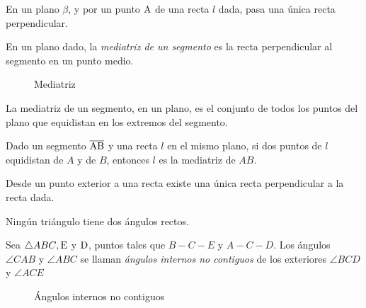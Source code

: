 \begin{theorem}
    En un plano $\beta$, y por un punto $\rm A$ de una recta $l$ dada, pasa una única recta perpendicular.
\end{theorem}

\begin{definition}
    En un plano dado, la \textit{mediatriz de un segmento} es la recta perpendicular al segmento en un punto medio.

    \begin{figure}[!h]
        \centering
        
        \caption{Mediatriz}
        \label{fig:bisector}
    \end{figure}
    
\end{definition}

\begin{theorem}
    La mediatriz de un segmento, en un plano, es el conjunto de todos los puntos del plano que equidistan en los extremos del segmento.
\end{theorem}

\begin{theorem}
    Dado un segmento $\overline{\rm AB}$ y una recta $l$ en el mismo plano, si dos puntos de $l$ equidistan de $A$ y de $B$, entonces $l$ es la mediatriz de $AB$.
\end{theorem}

\begin{theorem}
    Desde un punto exterior a una recta existe una única recta perpendicular a la recta dada.
\end{theorem}

\begin{theorem}
    Ningún triángulo tiene dos ángulos rectos.
\end{theorem}

\clearpage

\begin{definition}

Sea $\triangle{ABC}, \rm E$ y $\rm D$, puntos tales que $B-C-E$ y $A-C-D$. Los ángulos $\angle{CAB}$ y $\angle{ABC}$ se llaman \textit{ángulos internos no contiguos} de los exteriores $\angle{BCD}$ y $\angle{ACE}$

    \begin{figure}[!h]
        \centering
        
        \caption{Ángulos internos no contiguos}
        \label{fig:intext-angles}
    \end{figure}
    
\end{definition}

